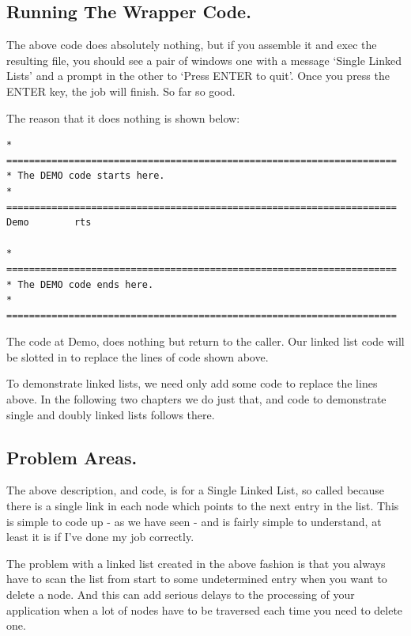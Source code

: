\subsection{Running The Wrapper Code.}
\label{ch10-single-list}%

The above code does absolutely nothing, but if you assemble it and
      exec the resulting file, you should see a pair of windows one with a
      message `Single Linked Lists' and a prompt in the other to `Press ENTER
      to quit'. Once you press the ENTER key, the job will finish. So far so
      good.

The reason that it does nothing is shown below:

\begin{lstlisting}[firstnumber=1,caption={Linked Lists - Wrapper - Demo Placeholder},label={LinkedListsWrapperDemoPlaceholder2}]
* =====================================================================
* The DEMO code starts here.
* =====================================================================
Demo        rts

* =====================================================================
* The DEMO code ends here.
* =====================================================================
\end{lstlisting}

The code at Demo, does nothing but return to the caller. Our
      linked list code will be slotted in to replace the lines of code shown
      above.

To demonstrate linked lists, we need only add some code to replace
      the lines above. In the following two chapters we do just that, and code
      to demonstrate single and doubly linked lists follows there. 

\subsection{Problem Areas.}
\label{ch10-problems}%

The above description, and code, is for a Single Linked List, so
      called because there is a single link in each node which points to the
      next entry in the list. This is simple to code up -{} as we have seen -{}
      and is fairly simple to understand, at least it is if I've done my job
      correctly.

The problem with a linked list created in the above fashion is
      that you always have to scan the list from start to some undetermined
      entry when you want to delete a node. And this can add serious delays to
      the processing of your application when a lot of nodes have to be
      traversed each time you need to delete one.

